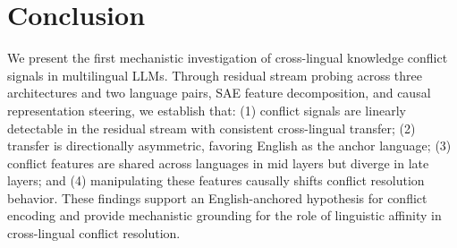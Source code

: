 \documentclass{article}
\begin{document}
\section{Conclusion}

We present the first mechanistic investigation of cross-lingual knowledge conflict signals in multilingual LLMs. Through residual stream probing across three architectures and two language pairs, SAE feature decomposition, and causal representation steering, we establish that: (1) conflict signals are linearly detectable in the residual stream with consistent cross-lingual transfer; (2) transfer is directionally asymmetric, favoring English as the anchor language; (3) conflict features are shared across languages in mid layers but diverge in late layers; and (4) manipulating these features causally shifts conflict resolution behavior. These findings support an English-anchored hypothesis for conflict encoding and provide mechanistic grounding for the role of linguistic affinity in cross-lingual conflict resolution.


\end{document}
